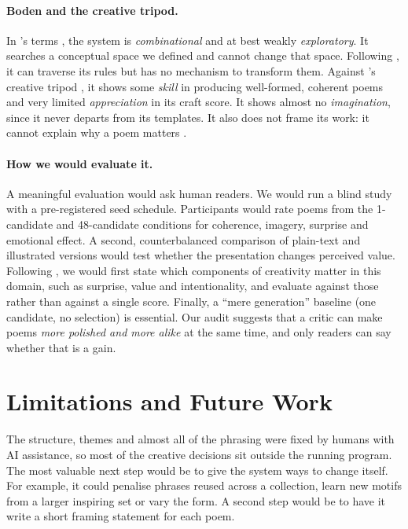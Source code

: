 \documentclass[letterpaper]{article}
\begin{document}
\paragraph{Boden and the creative tripod.}
In \citeauthor{boden2004}'s terms \citeyearpar{boden2004}, the system
is \emph{combinational} and at best weakly \emph{exploratory}. It
searches a conceptual space we defined and cannot change that space.
Following \citet{wiggins2006}, it can traverse its rules but has no
mechanism to transform them. Against \citeauthor{colton2008}'s
creative tripod \citeyearpar{colton2008}, it shows some \emph{skill} in
producing well-formed, coherent poems and very limited
\emph{appreciation} in its craft score. It shows almost no
\emph{imagination}, since it never departs from its templates.
It also does not frame its work: it cannot explain why a poem matters
\citep{colton2012fullface}.

\paragraph{How we would evaluate it.}
A meaningful evaluation would ask human readers. We would run a blind
study with a pre-registered seed schedule. Participants would rate
poems from the 1-candidate and 48-candidate conditions for coherence,
imagery, surprise and emotional effect. A second, counterbalanced
comparison of plain-text and illustrated versions would test whether
the presentation changes perceived value. Following
\citet{jordanous2012}, we would first state which components of
creativity matter in this domain, such as surprise, value and
intentionality, and evaluate against those rather than against a
single score. Finally, a ``mere generation'' baseline (one candidate,
no selection) is essential. Our audit suggests that a critic can make
poems \emph{more polished and more alike} at the same time, and only
readers can say whether that is a gain.

\section{Limitations and Future Work}
The structure, themes and almost all of the phrasing were fixed by
humans with AI assistance, so most of the creative decisions sit
outside the running program. The most valuable next step would be to
give the system ways to change itself. For example, it could penalise
phrases reused across a collection, learn new motifs from a larger
inspiring set or vary the form. A second step would be to have it
write a short framing statement for each poem.
\end{document}
